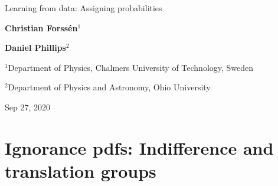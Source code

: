 \documentclass[%
oneside,                 %
final,                   %
10pt]{article}
\begin{document}

\newcommand{\exercisesection}[1]{\subsection*{#1}}







\thispagestyle{empty}

\begin{center}
{\LARGE\bf
\begin{spacing}{1.25}
Learning from data: Assigning probabilities
\end{spacing}
}
\end{center}


\begin{center}
{\bf Christian Forssén${}^{1}$} \\ [0mm]
\end{center}


\begin{center}
{\bf Daniel Phillips${}^{2}$} \\ [0mm]
\end{center}

\begin{center}
\centerline{{\small ${}^1$Department of Physics, Chalmers University of Technology, Sweden}}
\centerline{{\small ${}^2$Department of Physics and Astronomy, Ohio University}}
\end{center}
    

\begin{center}
Sep 27, 2020
\end{center}

\vspace{1cm}


\section{Ignorance pdfs: Indifference and translation groups}
\end{document}
